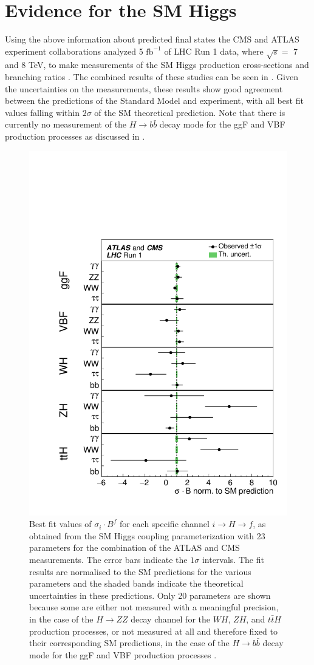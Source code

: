 \section{Evidence for the SM Higgs} \label{sec:higgs:higgs_evidence}

Using the above information about predicted final states the CMS and ATLAS
experiment collaborations analyzed 5 $\text{fb}^{-1}$ of LHC Run 1 data, where
$\sqrt{s} = $ 7 and 8 TeV, to make measurements of the SM Higgs production
cross-sections and branching ratios \cite{Khachatryan:2016vau}.  The combined
results of these studies can be seen in
.  Given the uncertainties on the measurements,
these results show good agreement between the predictions of the Standard Model
and experiment, with all best fit values falling within $2\sigma$ of the SM
theoretical prediction. Note that there is currently no measurement of the $H
\rightarrow b\bar{b}$ decay mode for the ggF and VBF production processes  as
discussed in .

\begin{figure}[!htbp]
  \begin{center}
    \includegraphics[width=0.5\linewidth]{figures/higgs/higgs_production_measurement.pdf}
    \caption{ Best fit values of $\sigma_{i} \cdot B^{f}$ for each specific channel $i \rightarrow H \rightarrow f$, as obtained from the SM Higgs coupling parameterization with 23 parameters for the combination of the ATLAS and CMS measurements. The error bars indicate the $1\sigma$ intervals. The fit results are normalised to the SM predictions for the various parameters and the shaded bands indicate the theoretical uncertainties in these predictions. Only 20 parameters are shown because some are either not measured with a meaningful precision, in the case of the $H \rightarrow ZZ$ decay channel for the $WH$, $ZH$, and $t\bar{t}H$ production processes, or not measured at all and therefore fixed to their corresponding SM predictions, in the case of the $H \rightarrow b\bar{b}$ decay mode for the ggF and VBF production processes \cite{Khachatryan:2016vau}.}
    \label{fig:higgs_production_measurement}
  \end{center}
\end{figure}

